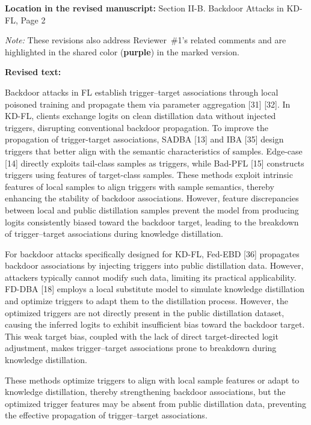 \documentclass[11pt,a4paper]{article}
\newcommand{\manualindent}{\par\noindent\hspace*{1.5em}\ignorespaces}
\newcommand{\revisedtext}[2]{%
  {\bfseries\color{headingnavy}Location in the revised manuscript:} #1\par
  \begin{tcolorbox}[
      enhanced,breakable,colback=replyblue!3,colframe=replyblue!18,
      before upper={\setlength{\parskip}{6pt}},
      borderline west={2.5pt}{0pt}{replyblue},
      boxrule=0.5pt,arc=1mm,left=11pt,right=9pt,top=8pt,bottom=8pt]
    {\bfseries\color{headingnavy}Revised text:}\par
    #2
  \end{tcolorbox}
  \vspace{0.35em}%
}
\begin{document}
\revisedtext{Section II-B. Backdoor Attacks in KD-FL, Page 2 \par \noindent \textit{Note:} These revisions also address Reviewer~\#1's related comments and are highlighted in the shared color (\textcolor{share}{\textbf{purple}}) in the marked version.}{\manualindent Backdoor attacks in FL establish trigger--target associations through local poisoned training and propagate them via parameter aggregation [31] [32].
In KD-FL, clients exchange logits on clean distillation data without injected triggers, disrupting conventional backdoor propagation.
To improve the propagation of trigger-target associations, SADBA [13] and IBA [35] design triggers that better align with the semantic characteristics of samples.
Edge-case [14] directly exploits tail-class samples as triggers, while Bad-PFL [15] constructs triggers using features of target-class samples.
These methods exploit intrinsic features of local samples to align triggers with sample semantics, thereby enhancing the stability of backdoor associations.
However, feature discrepancies between local and public distillation samples prevent the model from producing logits consistently biased toward the backdoor target, leading to the breakdown of trigger--target associations during knowledge distillation.

\manualindent For backdoor attacks specifically designed for KD-FL, Fed-EBD [36] propagates backdoor associations by injecting triggers into public distillation data. However, attackers typically cannot modify such data, limiting its practical applicability.
FD-DBA [18] employs a local substitute model to simulate knowledge distillation and optimize triggers to adapt them to the distillation process.
However, the optimized triggers are not directly present in the public distillation dataset, causing the inferred logits to exhibit insufficient bias toward the backdoor target. 
This weak target bias, coupled with the lack of direct target-directed logit adjustment, makes trigger–target associations prone to breakdown during knowledge distillation.

\manualindent These methods optimize triggers to align with local sample features or adapt to knowledge distillation, thereby strengthening backdoor associations, but the optimized trigger features may be absent from public distillation data, preventing the effective propagation of trigger--target associations.}
\end{document}
